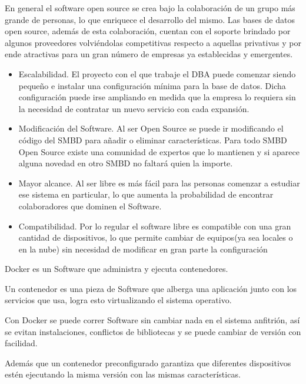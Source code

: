 \documentclass{exam}
\begin{document}
\begin{questions}
En general el software open source se crea bajo la colaboración de un grupo más grande de personas, lo que enriquece el desarrollo del mismo. Las bases de datos open source, además de esta colaboración, cuentan con el soporte brindado por algunos proveedores volviéndolas competitivas respecto a aquellas privativas y por ende atractivas para un gran número de empresas ya establecidas y emergentes.
	
	\question
	\begin{itemize}
	    \item Escalabilidad. El proyecto con el que trabaje el DBA puede comenzar siendo pequeño e instalar una configuración mínima para la base de datos. Dicha configuración puede irse ampliando en medida que la empresa lo requiera sin la necesidad de contratar un nuevo servicio con cada expansión.
	    
	    \item Modificación del Software. Al ser Open Source se puede ir modificando el código del SMBD para añadir o eliminar características. Para todo SMBD Open Source existe una comunidad de expertos que lo mantienen y si aparece alguna novedad en otro SMBD no faltará quien la importe. 
	    
	    \item Mayor alcance. Al ser libre es más fácil para las personas comenzar a estudiar ese sistema en particular, lo que aumenta la probabilidad de encontrar colaboradores que dominen el Software. 
	    
	    \item Compatibilidad. Por lo regular el software libre es compatible con una gran cantidad de dispositivos, lo que permite cambiar de equipos(ya sea locales o en la nube) sin necesidad de modificar en gran parte la configuración
	    
	\end{itemize}
	
	\question Docker es un Software que administra y ejecuta  contenedores. 
	
	Un contenedor es una pieza de Software que alberga una aplicación junto con los servicios que usa, logra esto virtualizando el sistema operativo. 
	
	Con Docker se puede correr Software sin cambiar nada en el sistema anfitrión, así se evitan instalaciones, conflictos de bibliotecas y se puede cambiar de versión con facilidad.
	
	Además que un contenedor preconfigurado garantiza que diferentes dispositivos estén ejecutando la misma versión con las mismas características.
	

\end{questions}
\end{document}
